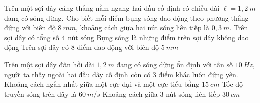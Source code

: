 \begin{ex}
Trên một sợi dây căng thẳng nằm ngang hai đầu cố định có chiều dài $\ell = 1,2\ m$ đang có sóng dừng. Cho biết mỗi điểm bụng sóng dao động theo phương thẳng đứng với biên độ $8\ mm$, khoảng cách giữa hai nút sóng liên tiếp là $0,3\ m$.
{Trên sợi dây có tổng số $4$ nút sóng}
{Bụng sóng là những điểm trên sợi dây không dao động}
{\True Trên sợi dây có $8$ điểm dao động với biên độ $5\ mm$}
\loigiai{
\begin{itemchoice}
\itemch
\itemch
\itemch
\itemch
\end{itemchoice}
}
\end{ex}
\begin{ex}
Trên một sợi dây đàn hồi dài $1,2\ m$ đang có sóng dừng ổn định với tần số $10\ Hz$, người ta thấy ngoài hai đầu dây cố định còn có 3 điểm khác luôn đứng yên.
{\True Khoảng cách ngắn nhất giữa một cực đại và một cực tiểu bằng $15\ cm$}
{Tốc độ truyền sóng trên dây là $60\ m/s$}
{Khoảng cách giữa 3 nút sóng liên tiếp $30\ cm$}

\end{ex}

